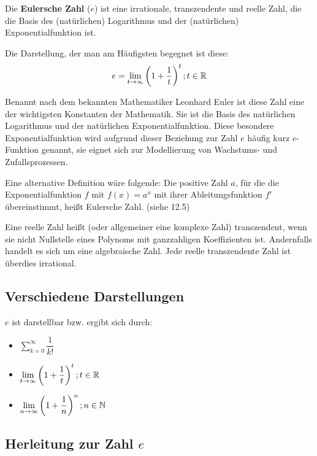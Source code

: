 \documentclass[main.tex]{subfiles}
\begin{document}
\begin{Definition}[$e = 2,71828182845904523536028747135266249775724709369995...$]
	Die \textbf{Eulersche Zahl} ($e$) ist eine irrationale, transzendente und reelle Zahl, die die Basis des (natürlichen) 			Logarithmus und der (natürlichen) Exponentialfunktion ist.

	Die Darstellung, der man am Häufigsten begegnet ist diese:
	$$e=\lim\limits_{t\to \infty}\left(1+\dfrac{1}{t}\right)^t;t\in\mathbb{R}$$
\end{Definition}

Benannt nach dem bekannten Mathematiker Leonhard Euler ist diese Zahl eine der wichtigsten Konstanten der Mathematik.
Sie ist die Basis des natürlichen Logarithmus und der natürlichen Exponentialfunktion. Diese besondere Exponentialfunktion wird aufgrund dieser Beziehung zur Zahl $e$ häufig kurz $e$-Funktion genannt, sie eignet sich zur Modellierung von Wachstums- und Zufallsprozessen.

\begin{Bemerkung}
	Eine alternative Definition wäre folgende:
	Die positive Zahl $a$, für die die Exponentialfunktion $f$ mit $f(x)=a^x$  mit ihrer Ableitungsfunktion $f'$ übereinstimmt, 		heißt Eulersche Zahl. (siehe 12.5)
\end{Bemerkung}

\begin{Definition}
  Eine reelle Zahl heißt (oder allgemeiner eine komplexe Zahl) transzendent,
  wenn sie nicht Nullstelle eines Polynoms mit ganzzahligen Koeffizienten ist.
  Andernfalls handelt es sich um eine algebraische Zahl. Jede reelle transzendente Zahl ist überdies irrational.
\end{Definition}


\subsection{Verschiedene Darstellungen}

$e$ ist darstellbar bzw. ergibt sich durch:
\begin{itemize}
\item $\sum\limits_{k=0}^{\infty}\dfrac{1}{k!}$
\item $\lim\limits_{t\to \infty}\left(1+\dfrac{1}{t}\right)^t;t\in\mathbb{R}$
\item $\lim\limits_{n\to \infty}\left(1+\dfrac{1}{n}\right)^n;n\in\mathbb{N}$
\end{itemize}


\subsection{Herleitung zur Zahl $e$}
\end{document}
